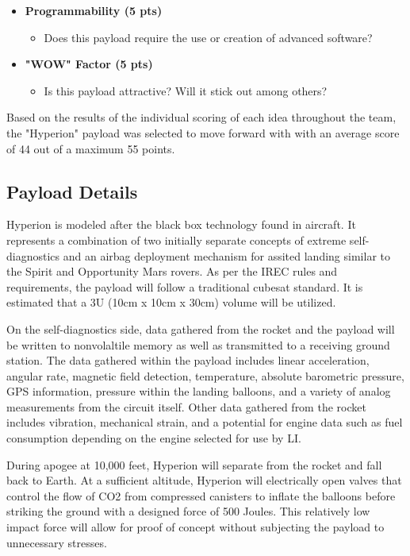 \documentclass[conference]{IEEEtran} %
\begin{document}
\begin{itemize}
  \item \textbf{Programmability (5 pts)}
  \begin{itemize}
    \item Does this payload require the use or creation of advanced software?
  \end{itemize}

  \item \textbf{"WOW" Factor (5 pts)}
  \begin{itemize}
    \item Is this payload attractive? Will it stick out among others?
  \end{itemize}
\end{itemize}

Based on the results of the individual scoring of each idea throughout the team, the "Hyperion" payload was selected to move forward with
with an average score of 44 out of a maximum 55 points.

\subsection{Payload Details}
\label{subsec:Payload Details}
Hyperion is modeled after the black box technology found in aircraft. It represents a combination of two initially separate concepts of extreme self-diagnostics
and an airbag deployment mechanism for assited landing similar to the Spirit and Opportunity Mars rovers. As per the IREC rules and requirements, the payload will
follow a traditional cubesat standard. It is estimated that a 3U (10cm x 10cm x 30cm) volume will be utilized.

On the self-diagnostics side, data gathered from the rocket and the payload will be written to nonvolaltile
memory as well as transmitted to a receiving ground station. The data gathered within the payload includes linear acceleration, angular rate, magnetic field detection,
temperature, absolute barometric pressure, GPS information, pressure within the landing balloons, and a variety of analog measurements from the circuit itself. Other data
gathered from the rocket includes vibration, mechanical strain, and a potential for engine data such as fuel consumption depending on the engine selected for use by LI.

During apogee at 10,000 feet, Hyperion will separate from the rocket and fall back to Earth. At a sufficient altitude, Hyperion will electrically open valves that
control the flow of CO2 from compressed canisters to inflate the balloons before striking the ground with a designed force of 500 Joules. This relatively low impact force
will allow for proof of concept without subjecting the payload to unnecessary stresses.
\end{document}
